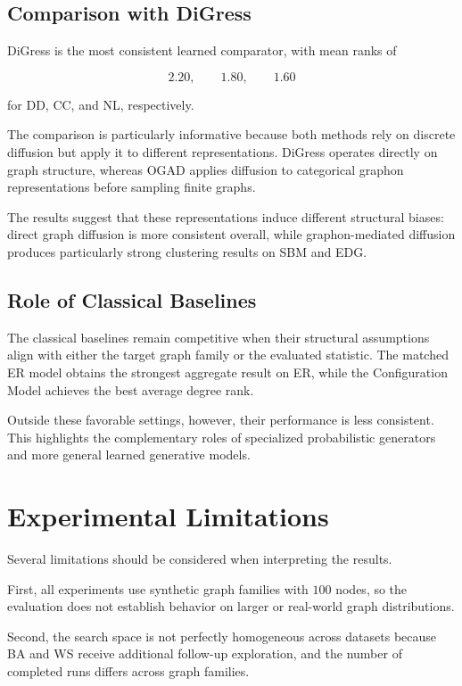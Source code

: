 \subsection{Comparison with DiGress}

DiGress is the most consistent learned comparator, with mean ranks of

\[
2.20,\qquad 1.80,\qquad 1.60
\]

for DD, CC, and NL, respectively.

The comparison is particularly informative because both methods rely on discrete diffusion but apply it to different representations. DiGress operates directly on graph structure, whereas OGAD applies diffusion to categorical graphon representations before sampling finite graphs.

The results suggest that these representations induce different structural biases: direct graph diffusion is more consistent overall, while graphon-mediated diffusion produces particularly strong clustering results on SBM and EDG.


\subsection{Role of Classical Baselines}

The classical baselines remain competitive when their structural assumptions align with either the target graph family or the evaluated statistic. The matched ER model obtains the strongest aggregate result on ER, while the Configuration Model achieves the best average degree rank.

Outside these favorable settings, however, their performance is less consistent. This highlights the complementary roles of specialized probabilistic generators and more general learned generative models.


\section{Experimental Limitations}
\label{sec:exp_limitations}

Several limitations should be considered when interpreting the results.

First, all experiments use synthetic graph families with \(100\) nodes, so the evaluation does not establish behavior on larger or real-world graph distributions.

Second, the search space is not perfectly homogeneous across datasets because BA and WS receive additional follow-up exploration, and the number of completed runs differs across graph families.

